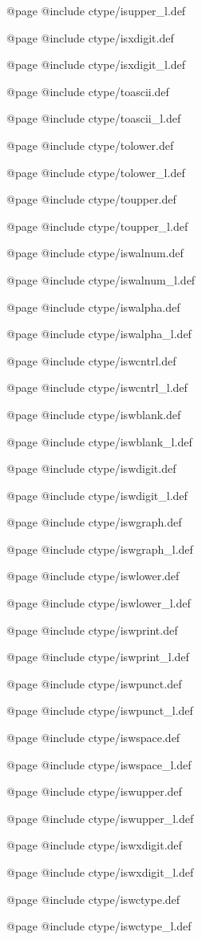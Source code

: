 @page
@include ctype/isupper_l.def

@page
@include ctype/isxdigit.def

@page
@include ctype/isxdigit_l.def

@page
@include ctype/toascii.def

@page
@include ctype/toascii_l.def

@page
@include ctype/tolower.def

@page
@include ctype/tolower_l.def

@page
@include ctype/toupper.def

@page
@include ctype/toupper_l.def

@page
@include ctype/iswalnum.def

@page
@include ctype/iswalnum_l.def

@page
@include ctype/iswalpha.def

@page
@include ctype/iswalpha_l.def

@page
@include ctype/iswcntrl.def

@page
@include ctype/iswcntrl_l.def

@page
@include ctype/iswblank.def

@page
@include ctype/iswblank_l.def

@page
@include ctype/iswdigit.def

@page
@include ctype/iswdigit_l.def

@page
@include ctype/iswgraph.def

@page
@include ctype/iswgraph_l.def

@page
@include ctype/iswlower.def

@page
@include ctype/iswlower_l.def

@page
@include ctype/iswprint.def

@page
@include ctype/iswprint_l.def

@page
@include ctype/iswpunct.def

@page
@include ctype/iswpunct_l.def

@page
@include ctype/iswspace.def

@page
@include ctype/iswspace_l.def

@page
@include ctype/iswupper.def

@page
@include ctype/iswupper_l.def

@page
@include ctype/iswxdigit.def

@page
@include ctype/iswxdigit_l.def

@page
@include ctype/iswctype.def

@page
@include ctype/iswctype_l.def

